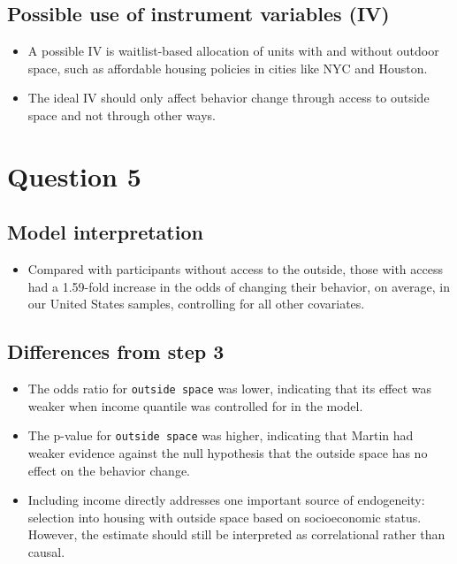 \documentclass[
  letterpaper,
  DIV=11,
  numbers=noendperiod]{scrartcl}
\providecommand{\tightlist}{%
  \setlength{\itemsep}{0pt}\setlength{\parskip}{0pt}}
\begin{document}
\subsection{Possible use of instrument variables
(IV)}\label{possible-use-of-instrument-variables-iv}

\begin{itemize}
\item
  A possible IV is waitlist-based allocation of units with and without
  outdoor space, such as affordable housing policies in cities like NYC
  and Houston.
\item
  The ideal IV should only affect behavior change through access to
  outside space and not through other ways.
\end{itemize}

\section{Question 5}\label{question-5}

\subsection{Model interpretation}\label{model-interpretation-1}

\begin{itemize}
\tightlist
\item
  Compared with participants without access to the outside, those with
  access had a 1.59-fold increase in the odds of changing their
  behavior, on average, in our United States samples, controlling for
  all other covariates.
\end{itemize}

\subsection{Differences from step 3}\label{differences-from-step-3}

\begin{itemize}
\item
  The odds ratio for \texttt{outside\ space} was lower, indicating that
  its effect was weaker when income quantile was controlled for in the
  model.
\item
  The p-value for \texttt{outside\ space} was higher, indicating that
  Martin had weaker evidence against the null hypothesis that the
  outside space has no effect on the behavior change.
\item
  Including income directly addresses one important source of
  endogeneity: selection into housing with outside space based on
  socioeconomic status. However, the estimate should still be
  interpreted as correlational rather than causal.
\end{itemize}
\end{document}
